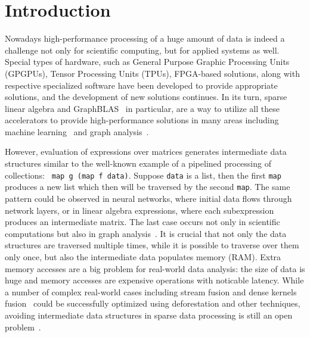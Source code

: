 \section{Introduction}

Nowadays high-performance processing of a huge amount of data is indeed a challenge not only for scientific computing, but for applied systems as well.
Special types of hardware, such as General Purpose Graphic Processing Units (GPGPUs), Tensor Processing Units (TPUs), FPGA-based solutions, along with respective specialized software have been developed to provide appropriate solutions, and the development of new solutions continues.
In its turn, sparse linear algebra and GraphBLAS~\cite{buluc2017graphblas} in particular, are a way to utilize all these accelerators to provide high-performance solutions in many areas including machine learning~\cite{Kepner2017} and graph analysis~\cite{graphblast}.

However, evaluation of expressions over matrices generates intermediate data structures similar to the well-known example of a pipelined processing of collections: \verb| map g (map f data)|. Suppose \verb|data| is a list, then the first \verb|map| produces a new list which then will be traversed by the second \verb|map|. The same pattern could be observed in neural networks, where initial data flows through network layers, or in linear algebra expressions, where each subexpression produces an intermediate matrix. 
The last case occurs not only in scientific computations but also in graph analysis~\cite{graphblast}.
It is crucial that not only the data structures are traversed multiple times, while it is possible to traverse over them only once, but also the intermediate data populates memory (RAM).
Extra memory accesses are a big problem for real-world data analysis: the size of data is huge and memory accesses are expensive operations with noticable latency.
While a number of complex real-world cases including stream fusion and dense kernels fusion~\cite{fusion-boosting-memory-computations} could be successfully optimized using deforestation and other techniques, avoiding intermediate data structures in sparse data processing is still an open problem~\cite{graphblast}.